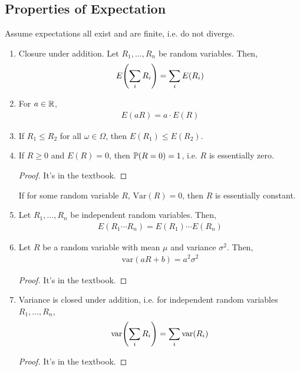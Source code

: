 \subsection{Properties of Expectation}
\begin{aside}
    Assume expectations all exist and are finite, i.e. do not diverge.
\end{aside}
\begin{enumerate}
    \item Closure under addition. Let $R_1, \ldots, R_n$ be random variables. Then,
    \begin{align}
        E\qty(\sum_i R_i) = \sum_i E(R_i)
    \end{align}
    \item For $a \in \mathbb{R}$,
    \begin{align}
        E(aR) = a \cdot E(R)
    \end{align}
    \item If $R_1 \le R_2$ for all $\omega \in \Omega$, then $E(R_1) \le E(R_2)$.
    \item If $R \ge 0$ and $E(R) = 0$, then $\mathbb{P}(R = 0) = 1$, i.e. $R$ is essentially zero.
    \begin{proof}
        It's in the textbook.
    \end{proof}
    \begin{aside}
        If for some random variable $R$, $\text{Var}(R) = 0$, then $R$ is essentially constant.
    \end{aside}
    \item Let $R_1, \ldots, R_n$ be independent random variables. Then,
    \begin{align}
        E(R_1\cdots R_n) = E(R_1) \cdots E(R_n)
    \end{align}
    \item Let $R$ be a random variable with mean $\mu$ and variance $\sigma^2$. Then,
    \begin{align}
        \text{var}(aR + b) = a^2\sigma^2
    \end{align}
    \begin{proof}
        It's in the textbook.
    \end{proof}
    \item Variance is closed under addition, i.e. for independent random variables $R_1, \ldots, R_n$,
    \begin{align}
        \text{var}\qty(\sum_i R_i) = \sum_i \text{var}\qty(R_i)
    \end{align}
    \begin{proof}
        It's in the textbook.
    \end{proof}
\end{enumerate}

